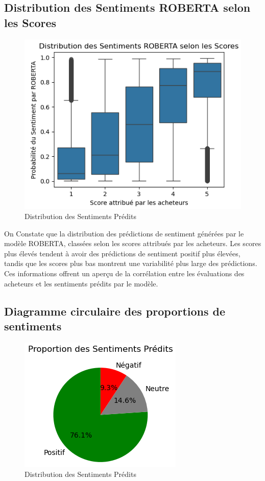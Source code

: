 \subsection{Distribution des Sentiments ROBERTA selon les Scores}
\begin{figure}[h]
    \centering
    \includegraphics[scale=0.7]{assets/sentimentrobertasurscore.PNG}
    \caption{Distribution des Sentiments Prédits}
    \label{fig:robertaSentimentssurscore}
\end{figure}
On Constate que la distribution des prédictions de sentiment générées par le modèle ROBERTA, classées selon les scores attribués par les acheteurs. Les scores plus élevés tendent à avoir des prédictions de sentiment positif plus élevées, tandis que les scores plus bas montrent une variabilité plus large des prédictions. Ces informations offrent un aperçu de la corrélation entre les évaluations des acheteurs et les sentiments prédits par le modèle.



\subsection{Diagramme circulaire des proportions de sentiments}
\begin{figure}[h]
    \centering
    \includegraphics[scale=0.7]{assets/proportiondessentimentspredits.PNG}
    \caption{Distribution des Sentiments Prédits}
    \label{fig:proportiondessentiments}
\end{figure}

